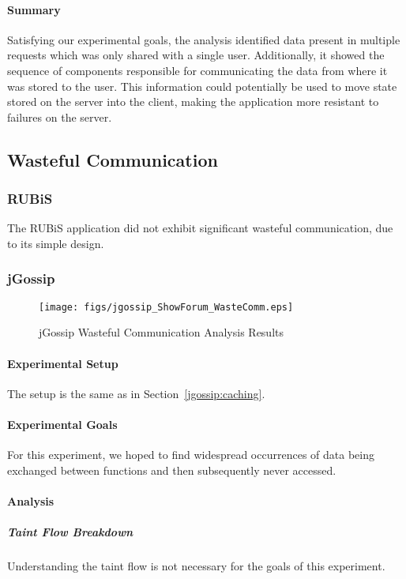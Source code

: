 \documentclass[msc,oneside]{ubcthesis}
\begin{document}
\paragraph{Summary}
Satisfying our experimental goals, the analysis identified data present in multiple requests which was only shared with a single user. Additionally, it showed the sequence of components responsible for communicating the data from where it was stored to the user. This information could potentially be used to move state stored on the server into the client, making the application more resistant to failures on the server.

\subsection{Wasteful Communication}
\label{ana:waste}
\subsubsection{RUBiS}

The RUBiS application did not exhibit significant wasteful communication, due to its simple design.

\subsubsection{jGossip} 

\begin{sidewaysfigure}
\centering
\scalebox{0.2}
{\texttt{[image: figs/jgossip\_ShowForum\_WasteComm.eps]}}
\caption{jGossip Wasteful Communication Analysis Results} 
\label{fig:showforumcomm}
\end{sidewaysfigure}

\paragraph{Experimental Setup}
The setup is the same as in Section~\ref{jgossip:caching}.

\paragraph{Experimental Goals}
For this experiment, we hoped to find widespread occurrences of data being exchanged between functions and then subsequently never accessed.

\paragraph{Analysis}
\subparagraph{Taint Flow Breakdown}
Understanding the taint flow is not necessary for the goals of this experiment.
\end{document}
